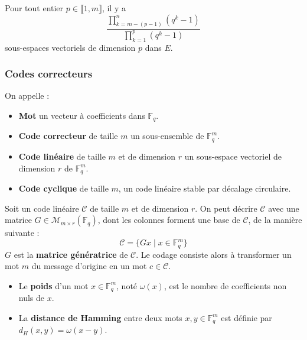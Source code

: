 
  \begin{application}
    Pour tout entier $p \in \llbracket 1, m \rrbracket$, il y a
    \[ \frac{\prod_{k=m-(p-1)}^{n} (q^k - 1)}{\prod_{k=1}^{p} (q^k - 1)} \]
    sous-espaces vectoriels de dimension $p$ dans $E$.
  \end{application}

  \subsubsection{Codes correcteurs}


  \begin{definition}
    On appelle :
    \begin{itemize}
      \item \textbf{Mot} un vecteur à coefficients dans $\mathbb{F}_q$.
      \item \textbf{Code correcteur} de taille $m$ un sous-ensemble de $\mathbb{F}_q^m$.
      \item \textbf{Code linéaire} de taille $m$ et de dimension $r$ un sous-espace vectoriel de dimension $r$ de $\mathbb{F}_q^m$.
      \item \textbf{Code cyclique} de taille $m$, un code linéaire stable par décalage circulaire.
    \end{itemize}
  \end{definition}

  \begin{example}
    Soit un code linéaire $\mathcal{C}$ de taille $m$ et de dimension $r$. On peut décrire $\mathcal{C}$ avec une matrice $G \in \mathcal{M}_{m \times r}(\mathbb{F}_q)$, dont les colonnes forment une base de $\mathcal{C}$, de la manière suivante :
    \[ \mathcal{C} = \{ Gx \mid x \in \mathbb{F}_q^m \} \]
    $G$ est la \textbf{matrice génératrice} de $\mathcal{C}$. Le codage consiste alors à transformer un mot $m$ du message d'origine en un mot $c \in \mathcal{C}$.
  \end{example}

  \begin{definition}
    \begin{itemize}
      \item Le \textbf{poids} d'un mot $x \in \mathbb{F}_q^m$, noté $\omega(x)$, est le nombre de coefficients non nuls de $x$.
      \item La \textbf{distance de Hamming} entre deux mots $x, y \in \mathbb{F}_q^m$ est définie par $d_H(x,y) = \omega(x-y)$.
    \end{itemize}
  \end{definition}

